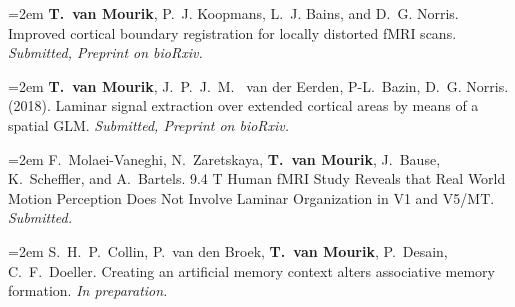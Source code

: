 \hangindent=2em
\noindent
{\textbf{T.~van Mourik}, P.~J. Koopmans, L.~J. Bains, and D.~G. Norris.} 
Improved cortical boundary registration for locally distorted fMRI scans.
\emph{Submitted, Preprint on bioRxiv.}


\hangindent=2em
\noindent
{\textbf{T.~van Mourik}, J.~P.~J.~M.~ van der Eerden, P-L.~Bazin, D.~G. Norris.} 
(2018).
Laminar signal extraction over extended cortical areas by means of a spatial GLM.
\emph{Submitted, Preprint on bioRxiv.}


\hangindent=2em
\noindent
{F.~Molaei-Vaneghi, N.~Zaretskaya, \textbf{T.~van Mourik}, J.~Bause, K.~Scheffler, and A.~Bartels.} 
9.4 T Human fMRI Study Reveals that Real World Motion Perception Does Not Involve Laminar Organization in V1 and V5/MT.
\emph{Submitted.}


\hangindent=2em
\noindent
{S.~H.~P.~Collin, P.~van den Broek, \textbf{T.~van Mourik}, P.~Desain, C.~F.~Doeller.}
Creating an artificial memory context alters associative memory formation.
\emph{In preparation.}
